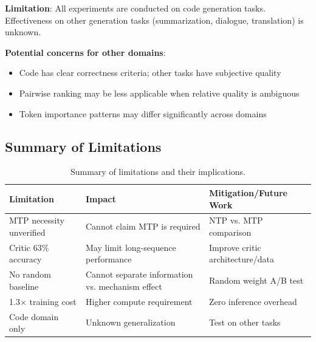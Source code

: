 \textbf{Limitation}: All experiments are conducted on code generation tasks. Effectiveness on other generation tasks (summarization, dialogue, translation) is unknown.

\textbf{Potential concerns for other domains}:
\begin{itemize}[nosep]
    \item Code has clear correctness criteria; other tasks have subjective quality
    \item Pairwise ranking may be less applicable when relative quality is ambiguous
    \item Token importance patterns may differ significantly across domains
\end{itemize}

\subsection{Summary of Limitations}

\begin{table}[h]
\centering
\caption{Summary of limitations and their implications.}
\label{tab:limitations_summary}
\begin{tabular}{lp{5cm}p{5cm}}
\toprule
\textbf{Limitation} & \textbf{Impact} & \textbf{Mitigation/Future Work} \\
\midrule
MTP necessity unverified & Cannot claim MTP is required & NTP vs. MTP comparison \\
Critic 63\% accuracy & May limit long-sequence performance & Improve critic architecture/data \\
No random baseline & Cannot separate information vs. mechanism effect & Random weight A/B test \\
1.3$\times$ training cost & Higher compute requirement & Zero inference overhead \\
Code domain only & Unknown generalization & Test on other tasks \\
\bottomrule
\end{tabular}
\end{table}
